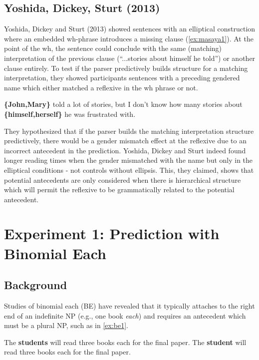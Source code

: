 \documentclass[12pt]{article}
\begin{document}
\subsection{Yoshida, Dickey, Sturt (2013)}
Yoshida, Dickey and Sturt (2013) \cite{Yoshida-Dickey-Sturt2013} showed sentences with an elliptical construction where an embedded wh-phrase introduces a missing clause (\ref{ex:masaya1}). At the point of the wh, the sentence could conclude with the same (matching) interpretation of the previous clause (``...stories about himself he told'') or another clause entirely. To test if the parser predictively builds structure for a matching interpretation, they showed participants sentences with a preceding gendered name which either matched a reflexive in the wh phrase or not.
\begin{exe}
    \ex \textbf{\{John,Mary\}} told a lot of stories, but I don't know how many stories about \textbf{\{himself,herself\}} he was frustrated with.        
    \label{ex:masaya1}
\end{exe}
They hypothesized that if the parser builds the matching interpretation structure predictively, there would be a gender mismatch effect at the reflexive due to an incorrect antecedent in the prediction. Yoshida, Dickey and Sturt indeed found longer reading times when the gender mismatched with the name but only in the elliptical conditions - not controls without ellipsis. This, they claimed, shows that potential antecedents are only considered when there is hierarchical structure which will permit the reflexive to be grammatically related to the potential antecedent.

\section{Experiment 1: Prediction with Binomial Each}
\subsection{Background}
Studies of binomial each (BE) \cite{Burzio1986,Safir-Stowell1987,Boeckx-Hornstein2005}
have revealed that it typically attaches to the right end of an indefinite NP (e.g., one book \textit{each})
and requires an antecedent which must be a plural NP, such as in \ref{ex:be1}.
\begin{exe}
    \ex \label{ex:be1}
    \begin{xlist}
        \ex The \textbf{students} will read three books each for the final paper.
        \ex *The \textbf{student} will read three books each for the final paper.
    \end{xlist}
\end{exe}
\end{document}
